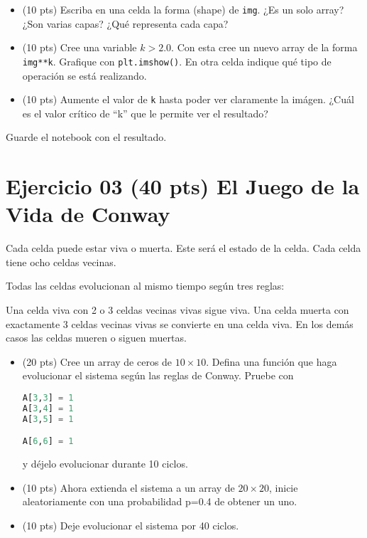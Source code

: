 \documentclass{article}
\begin{document}
\begin{itemize}
\item (10 pts) Escriba en una celda la forma (shape) de \texttt{img}.
  ¿Es un solo array? ¿Son varias capas? ¿Qué representa cada capa?
\item (10 pts) Cree una variable $k>2.0$. Con esta cree un nuevo array
  de la forma \texttt{img**k}. Grafique con \texttt{plt.imshow()}.
  En otra celda indique qué tipo de operación se está realizando.
\item (10 pts) Aumente el valor de \texttt{k} hasta poder ver claramente la
  imágen. ¿Cuál es el valor crítico de ``k'' que le permite ver el resultado?
\end{itemize}
Guarde el notebook con el resultado.

\section{Ejercicio 03 (40 pts) El Juego de la Vida de Conway}

Cada celda puede estar viva o muerta. Este será el estado de la celda. Cada celda tiene ocho celdas vecinas.

Todas las celdas evolucionan al mismo tiempo según tres reglas:

Una celda viva con 2 o 3 celdas vecinas vivas sigue viva.
Una celda muerta con exactamente 3 celdas vecinas vivas se convierte en una celda viva.
En los demás casos las celdas mueren o siguen muertas.

\begin{itemize}
\item (20 pts) Cree un array de ceros de $10 \times 10$. Defina una función
  que haga evolucionar el sistema según las reglas de Conway.
  Pruebe con
  \begin{lstlisting}[language=Python, caption=Array de prueba.]
A[3,3] = 1
A[3,4] = 1
A[3,5] = 1

A[6,6] = 1
  \end{lstlisting}
  y déjelo evolucionar durante 10 ciclos.
\item (10 pts) Ahora extienda el sistema a un array de $20\times20$, inicie aleatoriamente con una probabilidad p=0.4 de obtener un uno.
\item (10 pts) Deje evolucionar el sistema por 40 ciclos. 
\end{itemize}
\end{document}
